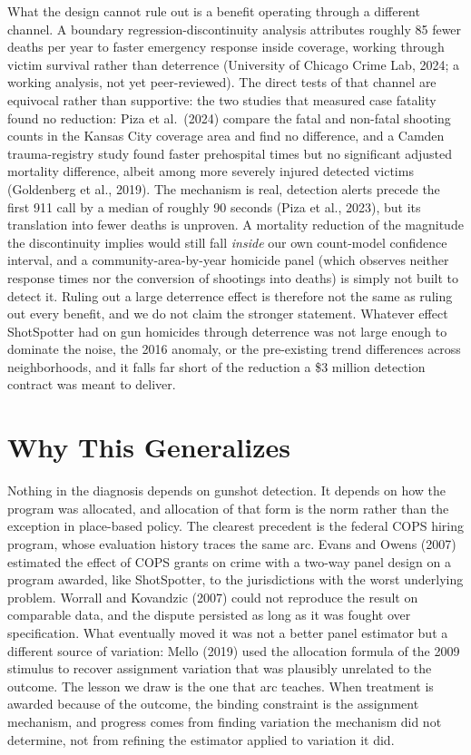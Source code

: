 \documentclass[12pt]{article}
\begin{document}
What the design cannot rule out is a benefit operating through a different channel. A
boundary regression-discontinuity analysis attributes roughly 85 fewer deaths per year to
faster emergency response inside coverage, working through victim survival rather than
deterrence (University of Chicago Crime Lab, 2024; a working analysis, not yet
peer-reviewed). The direct tests of that channel are equivocal rather than supportive: the
two studies that measured case fatality found no reduction: Piza et al.\ (2024) compare
the fatal and non-fatal shooting counts in the Kansas City coverage area and find no
difference, and a Camden trauma-registry study found faster prehospital times but no
significant adjusted mortality difference, albeit among more severely injured detected
victims (Goldenberg et al., 2019). The mechanism is real, detection alerts precede the
first 911 call by a median of roughly 90 seconds (Piza et al., 2023), but its translation
into fewer deaths is unproven. A mortality reduction of the magnitude the discontinuity
implies would still fall \emph{inside} our own count-model confidence interval, and a community-area-by-year homicide panel (which
observes neither response times nor the conversion of shootings into deaths) is simply not
built to detect it. Ruling out a large deterrence effect is therefore not the same as
ruling out every benefit, and we do not claim the stronger statement. Whatever effect
ShotSpotter had on gun homicides through deterrence was not large enough to dominate the
noise, the 2016 anomaly, or the pre-existing trend differences across neighborhoods, and it
falls far short of the reduction a \$3 million detection contract was meant to deliver.

\section{Why This Generalizes}
\label{sec:generalizes}

Nothing in the diagnosis depends on gunshot detection. It depends on how the program was
allocated, and allocation of that form is the norm rather than the exception in place-based
policy. The clearest precedent is the federal COPS hiring program, whose evaluation history
traces the same arc. Evans and Owens (2007) estimated the effect of COPS grants on crime
with a two-way panel design on a program awarded, like ShotSpotter, to the jurisdictions
with the worst underlying problem. Worrall and Kovandzic (2007) could not reproduce the
result on comparable data, and the dispute persisted as long as it was fought over
specification. What eventually moved it was not a better panel estimator but a different
source of variation: Mello (2019) used the allocation formula of the 2009 stimulus to
recover assignment variation that was plausibly unrelated to the outcome. The lesson we
draw is the one that arc teaches. When treatment is awarded because of the outcome, the
binding constraint is the assignment mechanism, and progress comes from finding variation
the mechanism did not determine, not from refining the estimator applied to variation it
did.
\end{document}
